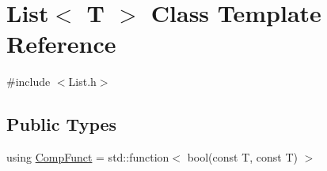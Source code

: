 \hypertarget{class_list}{}\section{List$<$ T $>$ Class Template Reference}
\label{class_list}


{\ttfamily \#include $<$List.\+h$>$}

\subsection*{Public Types}
\begin{DoxyCompactItemize}
\item 
using \hyperlink{class_list_a9e9db1a7f0275e9b4ca5a46e3d0874ff}{Comp\+Funct} = std\+::function$<$ bool(const T, const T) $>$
\end{DoxyCompactItemize}
